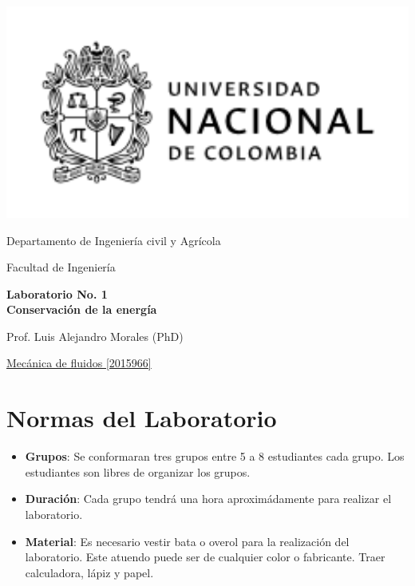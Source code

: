 \documentclass[10pt, a4paper]{exam}
\begin{document}
	\noindent
	\begin{minipage}[l]{0.1\textwidth}
		\noindent
		\includegraphics[width=2.8\textwidth]{ESCUDO.png}
	\end{minipage}
\hfill
\begin{minipage}[c]{0.8\textwidth}
	\begin{center}
		{\large  Departamento de Ingeniería civil y Agrícola\par
		\large	Facultad de Ingeniería	\par
    \large \textbf{Laboratorio No. 1 \\ Conservaci\'on de la energ\'ia}	\par
    \large Prof. Luis Alejandro Morales (PhD) \par
} %
	\end{center}
\end{minipage}
\par
\vspace{0.2in}
\noindent
    \uline{Mecánica de fluidos [2015966]}
\par 
\vspace{0.15in}
\noindent

\section{Normas del Laboratorio}
\begin{itemize}
    \item \textbf{Grupos}: Se conformaran tres grupos entre 5 a 8 estudiantes cada grupo. Los estudiantes son libres de organizar los grupos.
    \item \textbf{Duraci\'on}: Cada grupo tendr\'a una hora aproxim\'adamente  para realizar el laboratorio.
    \item \textbf{Material}: Es necesario vestir bata o overol para la realizaci\'on del laboratorio. Este atuendo puede ser de cualquier color o fabricante. Traer calculadora, l\'apiz y papel.
\end{itemize}
\end{document}
